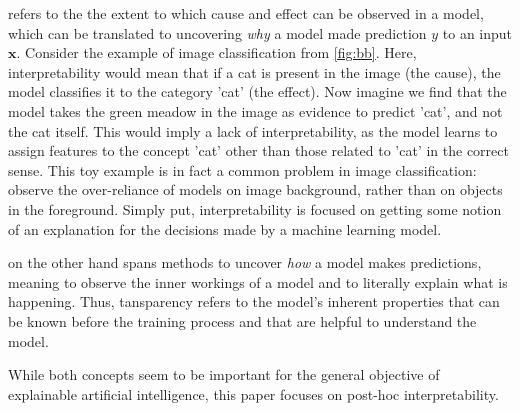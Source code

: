 refers to the the extent to which cause and effect can be observed in a model, which can be translated to uncovering \textit{why} a model made prediction $y$ to an input $\mathbf{x}$. Consider the example of image classification from \autoref{fig:bb}. Here, interpretability would mean that if a cat is present in the image (the cause), the model classifies it to the category 'cat' (the effect). Now imagine we find that the model takes the green meadow in the image as evidence to predict 'cat', and not the cat itself. 
This would imply a lack of interpretability, as the model learns to assign features to the concept 'cat' other than those related to 'cat' in the correct sense. This toy example is in fact a common problem in image classification: \cite{xiao2020noise} observe the over-reliance of models on image background, rather than on objects in the foreground. %
Simply put, interpretability is focused on getting some notion of an explanation for the decisions made by a machine learning model.

 on the other hand spans methods to uncover \textit{how} a model makes predictions, meaning to observe the inner workings of a model and to literally explain what is happening. Thus, tansparency refers to the model's inherent properties that can be known before the training process and that are helpful to understand the model.

\par\smallskip
While both concepts seem to be important for the general objective of explainable artificial intelligence, this paper focuses on post-hoc interpretability. 




